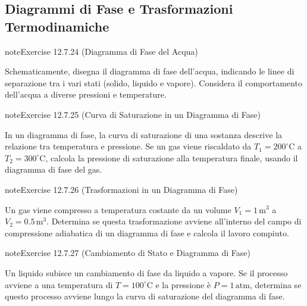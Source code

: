 \documentclass[letterpaper,10pt,italian]{jupyterBook}
\begin{document}
\subsection{Diagrammi di Fase e Trasformazioni Termodinamiche}
\label{\detokenize{ch/thermodynamics/principles-problems:diagrammi-di-fase-e-trasformazioni-termodinamiche}} \label{exercise:ch/thermodynamics/principles-problems-exercise-23}

\begin{sphinxadmonition}{note}{Exercise 12.7.24 (Diagramma di Fase del Acqua)}



\sphinxAtStartPar
Schematicamente, disegna il diagramma di fase dell’acqua, indicando le linee di separazione tra i vari stati (solido, liquido e vapore). Considera il comportamento dell’acqua a diverse pressioni e temperature.
\end{sphinxadmonition}
 \label{exercise:ch/thermodynamics/principles-problems-exercise-24}

\begin{sphinxadmonition}{note}{Exercise 12.7.25 (Curva di Saturazione in un Diagramma di Fase)}



\sphinxAtStartPar
In un diagramma di fase, la curva di saturazione di una sostanza descrive la relazione tra temperatura e pressione. Se un gas viene riscaldato da \(T_1 = 200^\circ \text{C}\) a \(T_2 = 300^\circ \text{C}\), calcola la pressione di saturazione alla temperatura finale, usando il diagramma di fase del gas.
\end{sphinxadmonition}
 \label{exercise:ch/thermodynamics/principles-problems-exercise-25}

\begin{sphinxadmonition}{note}{Exercise 12.7.26 (Trasformazioni in un Diagramma di Fase)}



\sphinxAtStartPar
Un gas viene compresso a temperatura costante da un volume \(V_1 = 1 \, \text{m}^3\) a \(V_2 = 0.5 \, \text{m}^3\). Determina se questa trasformazione avviene all’interno del campo di compressione adiabatica di un diagramma di fase e calcola il lavoro compiuto.
\end{sphinxadmonition}
 \label{exercise:ch/thermodynamics/principles-problems-exercise-26}

\begin{sphinxadmonition}{note}{Exercise 12.7.27 (Cambiamento di Stato e Diagramma di Fase)}



\sphinxAtStartPar
Un liquido subisce un cambiamento di fase da liquido a vapore. Se il processo avviene a una temperatura di \(T = 100^\circ \text{C}\) e la pressione è \(P = 1 \, \text{atm}\), determina se questo processo avviene lungo la curva di saturazione del diagramma di fase.
\end{sphinxadmonition}
 \label{exercise:ch/thermodynamics/principles-problems-exercise-27}
\end{document}

